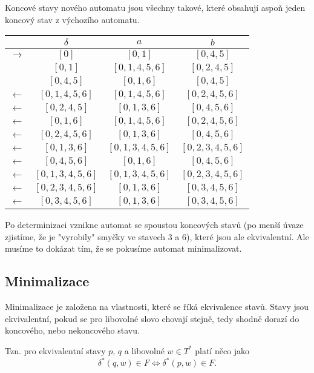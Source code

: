 \documentclass{article}
\begin{document}
Koncové stavy nového automatu jsou všechny takové, které obsahují aspoň jeden koncový stav z výchozího automatu.



\begin{tabular}{|rc||c|c|}
\hline
              & $\delta$ &      $a$ &   $b$\\
\hline
\hline
$\rightarrow$ & $[0]$ &   $[0,1]$ &       $[0,4,5]$\\
              & $[0,1]$ &       $[0,1,4,5,6]$ & $[0,2,4,5]$\\
              & $[0,4,5]$ &     $[0,1,6]$ &     $[0,4,5]$\\
$\leftarrow$  & $[0,1,4,5,6]$ &    $[0,1,4,5,6]$ & $[0,2,4,5,6]$\\
$\leftarrow$  & $[0,2,4,5]$ &      $[0,1,3,6]$ &   $[0,4,5,6]$\\
$\leftarrow$  & $[0,1,6]$ &        $[0,1,4,5,6]$ & $[0,2,4,5,6]$\\
$\leftarrow$  & $[0,2,4,5,6]$ &    $[0,1,3,6]$ &   $[0,4,5,6]$\\
$\leftarrow$  & $[0,1,3,6]$ &      $[0,1,3,4,5,6]$ &       $[0,2,3,4,5,6]$\\
$\leftarrow$  & $[0,4,5,6]$ &      $[0,1,6]$ &     $[0,4,5,6]$\\
$\leftarrow$  & $[0,1,3,4,5,6]$ &  $[0,1,3,4,5,6]$ &       $[0,2,3,4,5,6]$\\
$\leftarrow$  & $[0,2,3,4,5,6]$ &  $[0,1,3,6]$ &   $[0,3,4,5,6]$\\
$\leftarrow$  & $[0,3,4,5,6]$ &    $[0,1,3,6]$ &   $[0,3,4,5,6]$\\
\hline
\end{tabular}

Po determinizaci vznikne automat se spoustou koncových stavů (po menší úvaze zjistíme, že je "vyrobily" smyčky ve stavech 3 a 6), které jsou ale ekvivalentní. Ale musíme to dokázat tím, že se pokusíme automat minimalizovat.

\subsection{Minimalizace}

Minimalizace je založena na vlastnosti, které se říká ekvivalence stavů.
Stavy jsou ekvivalentní, pokud se pro libovolné slovo chovají stejně, tedy shodně dorazí do koncového, nebo nekoncového stavu.

Tzn. pro ekvivalentní stavy $p$, $q$ a libovolné $w \in T^*$ platí něco jako
$$\delta^*(q, w) \in F \Leftrightarrow \delta^*(p, w) \in F.$$
\end{document}
